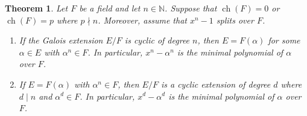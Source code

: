 \documentclass[10pt]{article}
\newcommand{\N}{\mathbb{N}}
\DeclareMathOperator{\ch}{ch}
\theoremstyle{newstyle}
\newtheorem{thm}{Theorem}[section]
\begin{document}
\begin{thm}
Let $F$ be a field and let $n \in \N$. Suppose that $\ch(F) = 0$ or $\ch(F) = p$ where 
$p \nmid n$. Moreover, assume that $x^n - 1$ splits over $F$. 
\begin{enumerate}[(1)]
    \item If the Galois extension $E/F$ is cyclic of degree $n$, then $E = F(\alpha)$ for some 
    $\alpha \in E$ with $\alpha^n \in F$. In particular, $x^n - \alpha^n$ is the minimal 
    polynomial of $\alpha$ over $F$. 
    \item If $E = F(\alpha)$ with $\alpha^n \in F$, then $E/F$ is a cyclic extension of degree $d$ 
    where $d \mid n$ and $\alpha^d \in F$. In particular, $x^d - \alpha^d$ is the minimal 
    polynomial of $\alpha$ over $F$. 
\end{enumerate}
\end{thm}
\end{document}

